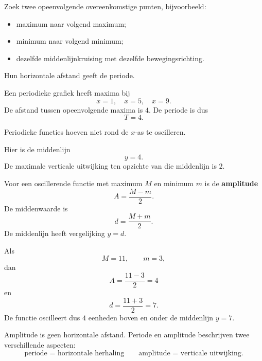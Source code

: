 \documentclass{ximera}
\begin{document}
Zoek twee opeenvolgende overeenkomstige punten, bijvoorbeeld:
\begin{itemize}
  \item maximum naar volgend maximum;
  \item minimum naar volgend minimum;
  \item dezelfde middenlijnkruising met dezelfde bewegingsrichting.
\end{itemize}

Hun horizontale afstand geeft de periode.

\begin{voorbeeld}
Een periodieke grafiek heeft maxima bij
\[
x=1,\quad x=5,\quad x=9.
\]
De afstand tussen opeenvolgende maxima is \(4\). De periode is dus
\[
T=4.
\]
\end{voorbeeld}


Periodieke functies hoeven niet rond de \(x\)-as te oscilleren.

\begin{center}
\end{center}

Hier is de middenlijn
\[
y=4.
\]
De maximale verticale uitwijking ten opzichte van die middenlijn is \(2\).

\begin{definitie}
Voor een oscillerende functie met maximum \(M\) en minimum \(m\) is de
\textbf{amplitude}
\[
\boxed{A=\frac{M-m}{2}}.
\]
De middenwaarde is
\[
\boxed{d=\frac{M+m}{2}}.
\]
De middenlijn heeft vergelijking \(y=d\).
\end{definitie}

\begin{voorbeeld}
Als
\[
M=11,\qquad m=3,
\]
dan
\[
A=\frac{11-3}{2}=4
\]
en
\[
d=\frac{11+3}{2}=7.
\]
De functie oscilleert dus \(4\) eenheden boven en onder de middenlijn \(y=7\).
\end{voorbeeld}

\begin{opmerking}
Amplitude is geen horizontale afstand. Periode en amplitude beschrijven twee
verschillende aspecten:
\[
\boxed{\text{periode = horizontale herhaling}}
\qquad
\boxed{\text{amplitude = verticale uitwijking}}.
\]
\end{opmerking}
\end{document}
